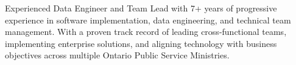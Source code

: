 

\begin{cvparagraph}

Experienced Data Engineer and Team Lead with 7+ years of progressive experience in software implementation, data engineering, and technical team management. With a proven track record of leading cross-functional teams, implementing enterprise solutions, and aligning technology with business objectives across multiple Ontario Public Service Ministries.
\end{cvparagraph}
